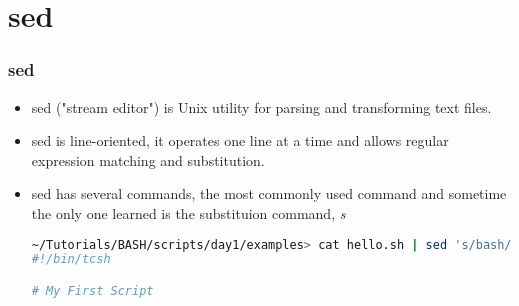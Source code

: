 \documentclass[slidestop,mathserif,compress,xcolor=svgnames]{beamer}
\begin{document}
\section{sed}
\begin{frame}
  \frametitle{\small sed}
  {\scriptsize
  \begin{itemize}
    \item sed ("stream editor") is Unix utility for parsing and transforming text files.
    \item sed is line-oriented, it operates one line at a time and allows regular expression matching and substitution.
    \item sed has several commands, the most commonly used command and sometime the only one learned  is the substituion command, \textit{s}
      \begin{lstlisting}[language=bash]
~/Tutorials/BASH/scripts/day1/examples> cat hello.sh | sed 's/bash/tcsh/g'
#!/bin/tcsh

# My First Script


\end{lstlisting}
\end{itemize}}
\end{frame}
\end{document}
